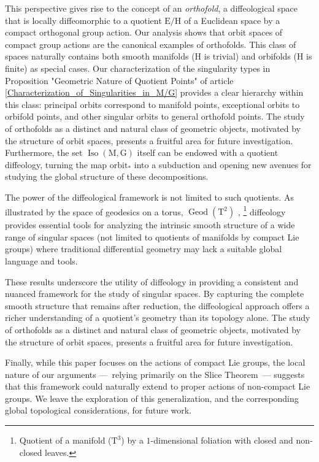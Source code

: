 \documentclass[10pt,reqno,letterpaper,twoside]{amsart}
\theoremstyle{article}
\def \E{\mathrm E}
\def \G{\mathrm G}
\def \H{\mathrm H}
\def \M{\mathrm M}
\def \T{\mathrm T}
\DeclareMathOperator{\Geod}{Geod}
\DeclareMathOperator{\Iso}{Iso}
\newcommand{\orbit}{{\mathrm{orbit}}}
\def \H{\mathrm H} %
\begin{document}
  This perspective gives rise to the concept of an \emph{orthofold},
  a diffeological space that is locally diffeomorphic to a quotient $\E/\H$ of a Euclidean space by a compact orthogonal group action.
  Our analysis shows that orbit spaces of compact group actions are the canonical examples of orthofolds.
  This class of spaces naturally contains both smooth manifolds ($\H$ is trivial) and orbifolds ($\H$ is finite) as special cases.
  Our characterization of the singularity types in Proposition "Geometric Nature of Quotient Points" of article \ref{Characterization_of_Singularities_in_M/G} provides a clear hierarchy within this class:
  principal orbits correspond to manifold points,
  exceptional orbits to orbifold points,
  and other singular orbits to general orthofold points.
  The study of orthofolds as a distinct and natural class of geometric objects,
  motivated by the structure of orbit spaces,
  presents a fruitful area for future investigation.
  Furthermore,
  the set $\Iso(\M,\G)$ itself can be endowed with a quotient diffeology,
  turning the map $\orbit_*$ into a subduction and opening new avenues for studying the global structure of these decompositions.
  
  The power of the diffeological framework is not limited to such quotients.
  As illustrated by the space of geodesics on a torus,
  $\Geod(\T^2)$ \cite[]{PIZ25},%
  \footnote{Quotient of a manifold ($\T^3$) by a $1$-dimensional foliation with closed and non-closed leaves.}
  diffeology provides essential tools for analyzing the intrinsic smooth structure of a wide range of singular spaces
  (not limited to quotients of manifolds by compact Lie groups)
  where traditional differential geometry may lack a suitable global language and tools.
    
  These results underscore the utility of diffeology in providing a consistent and nuanced framework for the study of singular spaces.
  By capturing the complete smooth structure that remains after reduction,
  the diffeological approach offers a richer understanding of a quotient's geometry than its topology alone.
  The study of orthofolds as a distinct and natural class of geometric objects,
  motivated by the structure of orbit spaces,
  presents a fruitful area for future investigation.
  
  Finally,
  while this paper focuses on the actions of compact Lie groups,
  the local nature of our arguments
  ---~relying primarily on the Slice Theorem~---
  suggests that this framework could naturally extend to proper actions of non-compact Lie groups.
  We leave the exploration of this generalization,
  and the corresponding global topological considerations,
  for future work.
  
\end{document}
